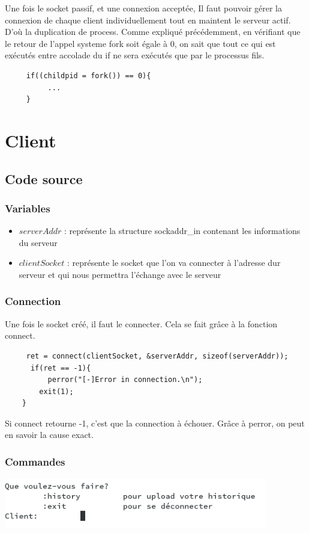 \documentclass[a4paper,11pt]{report}
\begin{document}
Une fois le socket passif, et une connexion acceptée, Il faut pouvoir gérer la connexion de chaque client individuellement tout en maintent le serveur actif. 
D'où la duplication de process. 
Comme expliqué précédemment, en vérifiant que le retour de l'appel systeme fork soit égale à 0, on sait que tout ce qui est exécutés entre accolade du if ne sera exécutés que par le processus fils.
\begin{lstlisting} 
     if((childpid = fork()) == 0){
          ...
     }
\end{lstlisting}


\chapter{Client}
\section{Code source}

\subsection{Variables}
\begin{itemize}
            \item $serverAddr$ : représente la structure sockaddr\_in contenant les informations du serveur
            \item $clientSocket$ : représente le socket que l'on va connecter à l'adresse dur serveur et qui nous permettra l'échange avec le serveur            
            
\end{itemize}
\subsection{Connection}
Une fois le socket créé, il faut le connecter. Cela se fait grâce à la fonction connect.
\begin{lstlisting} 
     ret = connect(clientSocket, &serverAddr, sizeof(serverAddr));
	  if(ret == -1){
		  perror("[-]Error in connection.\n");
		exit(1);
	}
\end{lstlisting}
	Si connect retourne -1, c'est que la connection à échouer. Grâce à perror, on peut en savoir la cause exact.
\subsection{Commandes}

\includegraphics[width=115mm]{../resources/commandes.png}
\end{document}
